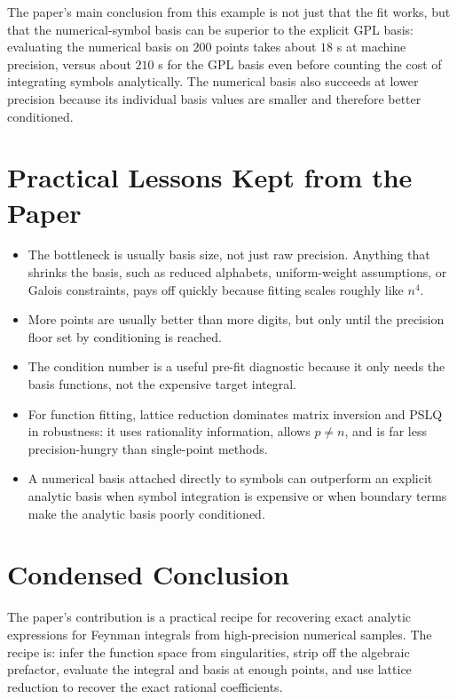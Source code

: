 \documentclass[11pt]{article}
\begin{document}
The paper's main conclusion from this example is not just that the fit works, but that the numerical-symbol basis can be superior to the explicit GPL basis: evaluating the numerical basis on $200$ points takes about $18$ s at machine precision, versus about $210$ s for the GPL basis even before counting the cost of integrating symbols analytically. The numerical basis also succeeds at lower precision because its individual basis values are smaller and therefore better conditioned.

\section{Practical Lessons Kept from the Paper}
\begin{itemize}
    \item The bottleneck is usually basis size, not just raw precision. Anything that shrinks the basis, such as reduced alphabets, uniform-weight assumptions, or Galois constraints, pays off quickly because fitting scales roughly like $n^4$.
    \item More points are usually better than more digits, but only until the precision floor set by conditioning is reached.
    \item The condition number is a useful pre-fit diagnostic because it only needs the basis functions, not the expensive target integral.
    \item For function fitting, lattice reduction dominates matrix inversion and PSLQ in robustness: it uses rationality information, allows $p\neq n$, and is far less precision-hungry than single-point methods.
    \item A numerical basis attached directly to symbols can outperform an explicit analytic basis when symbol integration is expensive or when boundary terms make the analytic basis poorly conditioned.
\end{itemize}

\section{Condensed Conclusion}
The paper's contribution is a practical recipe for recovering exact analytic expressions for Feynman integrals from high-precision numerical samples. The recipe is: infer the function space from singularities, strip off the algebraic prefactor, evaluate the integral and basis at enough points, and use lattice reduction to recover the exact rational coefficients.
\end{document}
